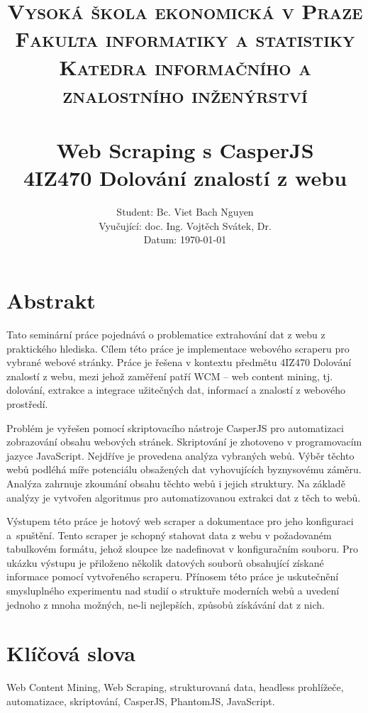 \documentclass[11pt,a4paper]{article}
\title{   \normalsize\textsc {
          \large{Vysoká škola ekonomická v Praze}\\[0.3cm]    
          \large{Fakulta informatiky a statistiky}\\[0.3cm]
          \large{Katedra informačního a znalostního inženýrství}\\
        }
\textsc{}   %
            \\[7.0cm]                                   %
            \huge \textbf{Web Scraping s CasperJS}      %
            \HRule{2pt} \\ [0.4cm]                      %
            \normalsize \textbf{4IZ470 Dolování znalostí z webu}
        }
\author{\raggedright
        Student: Bc. Viet Bach Nguyen \\
        Vyučující: doc. Ing. Vojtěch Svátek, Dr. \\
        Datum: \today
}
\makeatletter
\def\printtitle{                       
    {\centering \@title\par}}
\def\printauthor{                   
    {\centering \large \@author}}
\makeatother
\begin{document}
\thispagestyle{empty}           %

\printtitle                     %
      \vfill
\printauthor                    %
\newpage


\setcounter{page}{1}

\section*{Abstrakt}
Tato seminární práce pojednává o problematice extrahování dat z webu z praktického hlediska. Cílem této práce je implementace webového scraperu pro vybrané webové stránky. Práce je řešena v kontextu předmětu 4IZ470 Dolování znalostí z webu, mezi jehož zaměření patří WCM -- web content mining, tj. dolování, extrakce a integrace užitečných dat, informací a znalostí z webového prostředí. 

Problém je vyřešen pomocí skriptovacího nástroje CasperJS pro automatizaci zobrazování obsahu webových stránek. Skriptování je zhotoveno v programovacím jazyce JavaScript. Nejdříve je provedena analýza vybraných webů. Výběr těchto webů podléhá míře potenciálu obsažených dat vyhovujících byznysovému záměru. Analýza zahrnuje zkoumání obsahu těchto webů i jejich struktury. Na základě analýzy je vytvořen algoritmus pro automatizovanou extrakci dat z těch to webů. 

Výstupem této práce je hotový web scraper a dokumentace pro jeho konfiguraci a~spuštění. Tento scraper je schopný stahovat data z webu v požadovaném tabulkovém formátu, jehož sloupce lze nadefinovat v konfiguračním souboru. Pro ukázku výstupu je přiloženo několik datových souborů obsahující získané informace pomocí vytvořeného scraperu. Přínosem této práce je uskutečnění smysluplného experimentu nad studií o struktuře moderních webů a uvedení jednoho z mnoha možných, ne-li nejlepších, způsobů získávání dat z nich.

\section*{Klíčová slova}
Web Content Mining, Web Scraping, strukturovaná data, headless prohlížeče,\\ automatizace, skriptování, CasperJS, PhantomJS, JavaScript.

\newpage

 
\tableofcontents

\newpage
\end{document}
